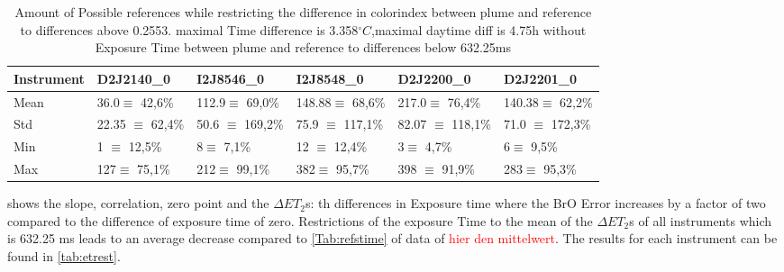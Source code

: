 \documentclass  [
  paper    = a4,
  BCOR     = 10mm,
  twoside,
  fontsize = 12pt,
  fleqn,
  toc      = bibnumbered,
  toc      = listofnumbered,
  numbers  = noendperiod,
  headings = normal,
  listof   = leveldown,
  version  = 3.03
]                                       {scrreprt}
\begin{document}
	\begin{table}
\begin{tabular}{|p{2cm}|p{2cm}|p{2cm}|p{2cm}|p{2cm}|p{2cm}|}
	Instrument	&D2J2140\_0&I2J8546\_0& I2J8548\_0&D2J2200\_0&D2J2201\_0\\
	\toprule
	Mean&
	36.0$\equiv$ 42,6\%&	112.9$\equiv$ 69,0\%&
	148.88$\equiv$ 68,6\%&	217.0$\equiv$ 76,4\%&	140.38$\equiv$ 62,2\%\\
	\midrule
	Std&
	22.35 $\equiv$	62,4\%&
	50.6 $\equiv$	169,2\% &
	75.9 $\equiv$	117,1\%&
	82.07 $\equiv$	118,1\% &
	71.0 $\equiv$	172,3\% \\
	\midrule
	Min&
	1 $\equiv$	    12,5\%  &
	8$\equiv$	7,1\%  &
	12 $\equiv$	12,4\%  &
	3$\equiv$	4,7\%   &
	6$\equiv$	9,5\%  \\
	\midrule
	Max
	&127$\equiv$	75,1\%
	&212$\equiv$	99,1\%
	&382$\equiv$	95,7\%
	&398 $\equiv$	91,9\%
	&283$\equiv$	95,3\%\\
	\bottomrule
\end{tabular}
\caption{Amount of Possible references while restricting the difference in colorindex  between plume and reference to differences above 0.2553. maximal Time difference is 3.358$^{\circ}C$,maximal daytime diff is 4.75h without Exposure Time  between plume and reference to differences below 632.25ms}
\end{table}	

 shows the slope, correlation, zero point and the $\Delta ET_{2}$s: th differences in Exposure time where the BrO Error increases by a factor of two compared to the difference of exposure time of zero.
Restrictions of the exposure Time to the mean of the $\Delta ET_{2}$s of all instruments which is 632.25 ms leads to an average decrease compared to \cref{Tab:refstime} of data of \textcolor{red}{ hier den mittelwert}. The results for each instrument can be found in \cref{tab:etrest}.
\end{document}
